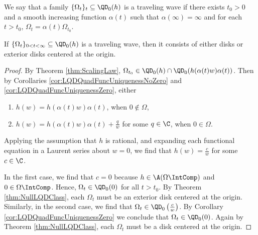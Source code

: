 \documentclass{article}
\numberwithin{equation}{section}
\begin{document}
We say that a family $\{\Omega_t\}_{t}\subseteq\QD_0(h)$ is a traveling wave if there exists $t_0>0$ and a smooth increasing function $\alpha(t)$ such that $\alpha(\infty)=\infty$ and for each $t>t_0$, $\Omega_t=\alpha(t)\Omega_{t_0}$.

\begin{corollary}\label{cor:TravelingWaveV1}
    If $\{\Omega_t\}_{0<t<\infty}\subseteq\QD_0(h)$ is a traveling wave, then it consists of either disks or exterior disks centered at the origin.
\end{corollary}
\begin{proof}
By Theorem \ref{thm:ScalingLaw}, $\Omega_{t_0}\in\QD_0(h)\cap \QD_0(h(\alpha(t)w)\alpha(t))$. Then by Corollaries \ref{cor:LQDQuadFuncUniquenessNoZero} and \ref{cor:LQDQuadFuncUniquenessZero}, either
\begin{enumerate}
    \item $h(w)=h(\alpha(t)w)\alpha(t)$, when $0\notin\Omega$,
    \item $h(w)=h(\alpha(t)w)\alpha(t)+\frac{q}{w}$ for some $q\in\C$, when $0\in\Omega$.
\end{enumerate}
Applying the assumption that $h$ is rational, and expanding each functional equation in a Laurent series about $w=0$, we find that $h(w)=\frac{c}{w}$ for some $c\in\C$.

In the first case, we find that $c=0$ because $h\in\A(\Omega\IntComp)$ and $0\in\Omega\IntComp$. Hence, $\Omega_t\in\QD_0(0)$ for all $t>t_0$. By Theorem \ref{thm:NullLQDClass}, each $\Omega_t$ must be an exterior disk centered at the origin. Similarly, in the second case, we find that $\Omega_t\in\QD_0\left(\frac{c}{w}\right)$. By Corollary \ref{cor:LQDQuadFuncUniquenessZero} we conclude that $\Omega_t\in\QD_0(0)$. Again by Theorem \ref{thm:NullLQDClass}, each $\Omega_t$ must be a disk centered at the origin.
\end{proof}
\end{document}
